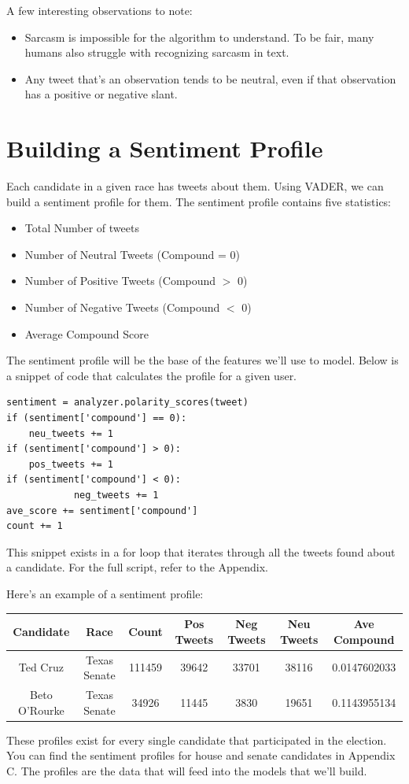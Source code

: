 \documentclass[11pt, twoside, reqno]{book}
\begin{document}
A few interesting observations to note:
\begin{itemize}
	\item Sarcasm is impossible for the algorithm to understand. To be fair, many humans also struggle with recognizing sarcasm in text.
	\item Any tweet that's an observation tends to be neutral, even if that observation has a positive or negative slant. 
\end{itemize}

\section{Building a Sentiment Profile}
Each candidate in a given race has tweets about them. Using VADER, we can build a sentiment profile for them. The sentiment profile contains five statistics:
\begin{itemize}
	\item Total Number of tweets
	\item Number of Neutral Tweets (Compound = 0)
	\item Number of Positive Tweets (Compound $>$ 0)
	\item Number of Negative Tweets (Compound $<$ 0)
	\item Average Compound Score
\end{itemize}
The sentiment profile will be the base of the features we'll use to model. Below is a snippet of code that calculates the profile for a given user.
\begin{verbatim}
sentiment = analyzer.polarity_scores(tweet) 
if (sentiment['compound'] == 0):        
	neu_tweets += 1          
if (sentiment['compound'] > 0):        
	pos_tweets += 1            
if (sentiment['compound'] < 0):
        	neg_tweets += 1
ave_score += sentiment['compound']
count += 1
\end{verbatim}
This snippet exists in a for loop that iterates through all the tweets found about a candidate. For the full script, refer to the Appendix. 

Here's an example of a sentiment profile:
\begin{center}
\begin{tabular}{ |c|c|c|c|c|c|c|} 
	\hline
	Candidate & Race & Count & Pos Tweets & Neg Tweets & Neu Tweets & Ave Compound\\
 	\hline 
	Ted Cruz & Texas Senate & 111459 & 39642 & 33701 & 38116 & 0.0147602033 \\
  	\hline
	Beto O'Rourke & Texas Senate & 34926 & 11445 & 3830 & 19651 & 0.1143955134 \\ 
	\hline
\end{tabular}
\end{center}
These profiles exist for every single candidate that participated in the election. You can find the sentiment profiles for house and senate candidates in Appendix C. The profiles are the data that will feed into the models that we'll build. 
\end{document}
